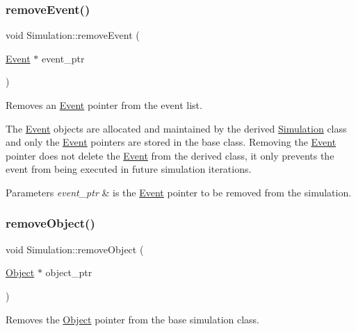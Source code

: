 \subsubsection{\texorpdfstring{remove\+Event()}{removeEvent()}}
{\footnotesize\ttfamily void Simulation\+::remove\+Event (\begin{DoxyParamCaption}\item[{\hyperlink{class_event}{Event} $\ast$}]{event\+\_\+ptr }\end{DoxyParamCaption})\hspace{0.3cm}{\ttfamily [protected]}}



Removes an \hyperlink{class_event}{Event} pointer from the event list. 

The \hyperlink{class_event}{Event} objects are allocated and maintained by the derived \hyperlink{class_simulation}{Simulation} class and only the \hyperlink{class_event}{Event} pointers are stored in the base class. Removing the \hyperlink{class_event}{Event} pointer does not delete the \hyperlink{class_event}{Event} from the derived class, it only prevents the event from being executed in future simulation iterations. 
\begin{DoxyParams}{Parameters}
{\em event\+\_\+ptr} & is the \hyperlink{class_event}{Event} pointer to be removed from the simulation. \\
\hline
\end{DoxyParams}
\mbox{\label{class_simulation_a39da17feb9b487c05c9a834def44972f}} 
\subsubsection{\texorpdfstring{remove\+Object()}{removeObject()}}
{\footnotesize\ttfamily void Simulation\+::remove\+Object (\begin{DoxyParamCaption}\item[{\hyperlink{class_object}{Object} $\ast$}]{object\+\_\+ptr }\end{DoxyParamCaption})\hspace{0.3cm}{\ttfamily [protected]}}



Removes the \hyperlink{class_object}{Object} pointer from the base simulation class. 

